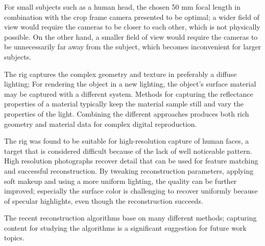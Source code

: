 For small subjects such as a human head, the chosen 50 mm focal length in combination with the crop frame camera presented to be optimal; a wider field of view would require the cameras to be closer to each other, which is not physically possible.
On the other hand, a smaller field of view would require the cameras to be unnecessarily far away from the subject, which becomes inconvenient for larger subjects.

The rig captures the complex geometry and texture in preferably a diffuse lighting;
For rendering the object in a new lighting, the object's surface material may be captured with a different system.
Methods for capturing the reflectance properties of a material typically keep the material sample still and vary the properties of the light. \cite{debevec2000acquiring} \cite{aittala2013practical}
Combining the different approaches produces both rich geometry and material data for complex digital reproduction.




The rig was found to be suitable for high-resolution capture of human faces, a target that is considered difficult because of the lack of well noticeable pattern.
High resolution photographs recover detail that can be used for feature matching and successful reconstruction.
By tweaking reconstruction parameters, applying soft makeup and using a more uniform lighting, the quality can be further improved;
especially the surface color is challenging to recover uniformly because of specular highlights, even though the reconstruction succeeds.

The recent reconstruction algorithms base on many different methods; capturing content for studying the algorithms is a significant suggestion for future work topics.


